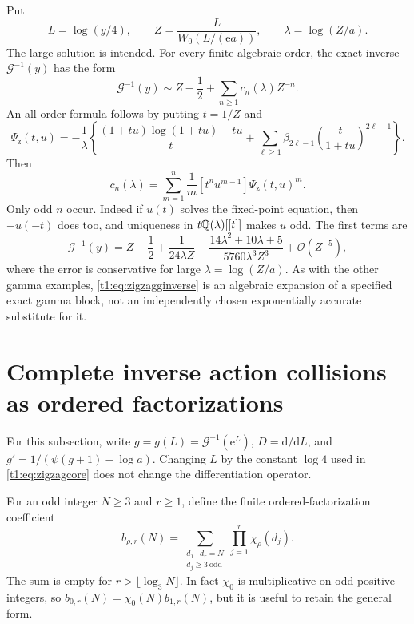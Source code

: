 \documentclass[11pt,openany]{book}
\numberwithin{equation}{chapter}
\theoremstyle{plain}
\theoremstyle{definition}
\theoremstyle{remark}
\newcommand{\ee}{\mathrm e}
\newcommand{\ddn}{\mathrm d}                  %
\newcommand{\OO}{\mathcal O}\newcommand{\bigO}{\mathcal O}
\newcommand{\coefA}[1]{\left[#1\right]}       %
\begin{document}
Put
\begin{equation}
 L=\log(y/4),\qquad
 Z=\frac{L}{W_0(L/(\ee a))},\qquad
 \lambda=\log(Z/a).
 \label{t1:eq:zigzagcore}
\end{equation}
The large solution is intended. For every finite algebraic order, the exact inverse $\mathcal G^{-1}(y)$ has the form
\begin{equation}
 \mathcal G^{-1}(y)\sim Z-\frac12+
 \sum_{n\ge1}c_n(\lambda)Z^{-n}.
 \label{t1:eq:zigzagginverse}
\end{equation}
An all-order formula follows by putting $t=1/Z$ and
\begin{equation}
 \Psi_{\mathrm z}(t,u)=-\frac1\lambda\left\{
 \frac{(1+tu)\log(1+tu)-tu}{t}
 +\sum_{\ell\ge1}\beta_{2\ell-1}
 \left(\frac{t}{1+tu}\right)^{2\ell-1}\right\}.
 \label{t1:eq:zigzagpsi}
\end{equation}
Then
\begin{equation}
 c_n(\lambda)=\sum_{m=1}^n\frac1m
 \coefA{t^n u^{m-1}}\Psi_{\mathrm z}(t,u)^m.
 \label{t1:eq:zigzagcoeff}
\end{equation}
Only odd $n$ occur. Indeed if $u(t)$ solves the fixed-point equation, then $-u(-t)$ does too, and uniqueness in $t\mathbb Q(\lambda)[[t]]$ makes $u$ odd. The first terms are
\begin{equation}
 \mathcal G^{-1}(y)=Z-\frac12+\frac1{24\lambda Z}
 -\frac{14\lambda^2+10\lambda+5}{5760\lambda^3 Z^3}
 +\OO(Z^{-5}),
 \label{t1:eq:zigzagfirst}
\end{equation}
where the error is conservative for large $\lambda=\log(Z/a)$. As with the other gamma examples, \eqref{t1:eq:zigzagginverse} is an algebraic expansion of a specified exact gamma block, not an independently chosen exponentially accurate substitute for it.

\section{Complete inverse action collisions as ordered factorizations}
For this subsection, write $g=g(L)=\mathcal G^{-1}(\ee^L)$, $D=\ddn/\ddn L$, and $g'=1/(\psi(g+1)-\log a)$. Changing $L$ by the constant $\log4$ used in \eqref{t1:eq:zigzagcore} does not change the differentiation operator.

For an odd integer $N\ge3$ and $r\ge1$, define the finite ordered-factorization coefficient
\begin{equation}
 b_{\rho,r}(N)=
 \sum_{\substack{d_1\cdots d_r=N\\d_j\ge3\ \mathrm{odd}}}
 \prod_{j=1}^r\chi_\rho(d_j).
 \label{t1:eq:orderedfactor}
\end{equation}
The sum is empty for $r>\lfloor\log_3N\rfloor$. In fact $\chi_0$ is multiplicative on odd positive integers, so $b_{0,r}(N)=\chi_0(N)b_{1,r}(N)$, but it is useful to retain the general form.
\end{document}
